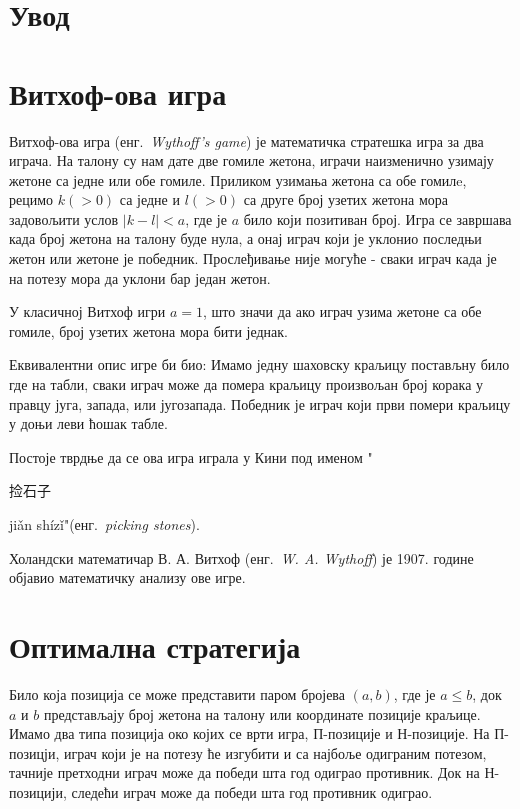 \documentclass[a4paper]{article}
\begin{document}

\newpage
{}
\tableofcontents

\newpage
{}
\section{Увод}
\label{sec:uvod}



\section{Витхоф-ова игра}
\label{sec:vithofova_igra}

Витхоф-ова игра (енг.{~\em Wythoff's game})\cite{10.2307/2321643} је математичка стратешка игра за два играча. На талону су нам дате две гомиле жетона, играчи наизменично узимају жетоне са једне или обе гомиле. Приликом узимања жетона са обе гомилe, рецимо $ k (> 0) $ са једне и $ l (> 0) $ са друге број узетих жетона мора задовољити услов $ |k - l| < a $, где је $ a $ било који позитиван број. Игра се завршава када број жетона на талону буде нула, а онај играч који је уклонио последњи жетон или жетоне је победник. Прослеђивање није могуће - сваки играч када је на потезу мора да уклони бар један жетон.

У класичној Витхоф игри $ a = 1 $, што значи да ако играч узима жетоне са обе гомиле, број узетих жетона мора бити једнак.

Еквивалентни опис игре би био: Имамо једну шаховску краљицу постављну било где на табли, сваки играч може да помера краљицу произвољан број корака у правцу југа, запада, или југозапада. Победник је играч који први помери краљицу у доњи леви ћошак табле.\cite{cut-the-knot} \cite{singingbanana-youtube}

Постоје тврдње да се ова игра играла у Кини  под именом "\begin{CJK}{UTF8}{gbsn}捡石子\end{CJK} jiǎn shízǐ"(енг.{~\em picking stones}). \cite{Yaglom}

Холандски математичар В. А. Витхоф (енг.{~\em W. A. Wythoff}) је 1907. године објавио математичку анализу ове игре. \cite{wythoff1907modification}

\section{Оптимална стратегија}
\label{sec:optimalna_strategija}

Било која позиција се може представити паром бројева $ (a, b) $, где је $ a \le  b $, док  $ a $ и $ b $ представљају број жетона на талону или координате позиције краљице. Имамо два типа позиција око којих се врти игра, П-позиције и Н-позиције. На П-позицји, играч који је на потезу ће изгубити и са најбоље одиграним потезом, тачније претходни играч може да победи шта год одиграо противник. Док на Н-позицији, следећи играч може да победи шта год противник одиграо. %
\end{document}
